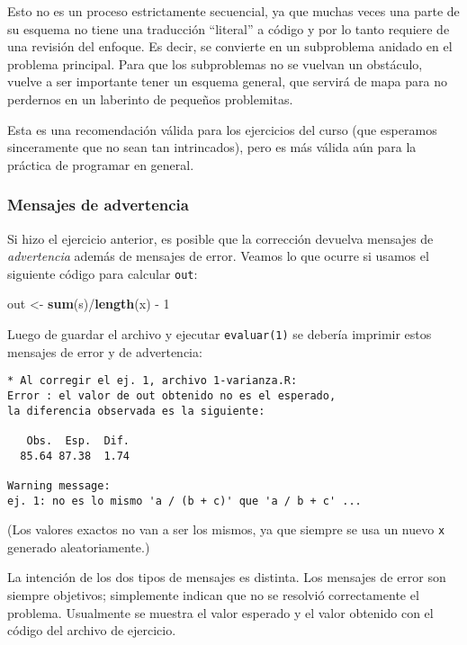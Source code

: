 \documentclass[]{article}
\newenvironment{Shaded}{}{}
\newcommand{\KeywordTok}[1]{\textcolor[rgb]{0.00,0.44,0.13}{\textbf{{#1}}}}
\newcommand{\DecValTok}[1]{\textcolor[rgb]{0.25,0.63,0.44}{{#1}}}
\newcommand{\NormalTok}[1]{{#1}}
\begin{document}
Esto no es un proceso estrictamente secuencial, ya que muchas veces una
parte de su esquema no tiene una traducción ``literal'' a código y por
lo tanto requiere de una revisión del enfoque. Es decir, se convierte en
un subproblema anidado en el problema principal. Para que los
subproblemas no se vuelvan un obstáculo, vuelve a ser importante tener
un esquema general, que servirá de mapa para no perdernos en un
laberinto de pequeños problemitas.

Esta es una recomendación válida para los ejercicios del curso (que
esperamos sinceramente que no sean tan intrincados), pero es más válida
aún para la práctica de programar en general.

\subsubsection{Mensajes de advertencia}

Si hizo el ejercicio anterior, es posible que la corrección devuelva
mensajes de \emph{advertencia} además de mensajes de error. Veamos lo
que ocurre si usamos el siguiente código para calcular \texttt{out}:

\begin{Shaded}
\begin{Highlighting}[]
\NormalTok{out <- }\KeywordTok{sum}\NormalTok{(s)/}\KeywordTok{length}\NormalTok{(x) - }\DecValTok{1}
\end{Highlighting}
\end{Shaded}
Luego de guardar el archivo y ejecutar \texttt{evaluar(1)} se debería
imprimir estos mensajes de error y de advertencia:

\begin{verbatim}
* Al corregir el ej. 1, archivo 1-varianza.R:
Error : el valor de out obtenido no es el esperado,
la diferencia observada es la siguiente:

   Obs.  Esp.  Dif. 
  85.64 87.38  1.74

Warning message:
ej. 1: no es lo mismo 'a / (b + c)' que 'a / b + c' ...
\end{verbatim}
(Los valores exactos no van a ser los mismos, ya que siempre se usa un
nuevo \texttt{x} generado aleatoriamente.)

La intención de los dos tipos de mensajes es distinta. Los mensajes de
error son siempre objetivos; simplemente indican que no se resolvió
correctamente el problema. Usualmente se muestra el valor esperado y el
valor obtenido con el código del archivo de ejercicio.
\end{document}
